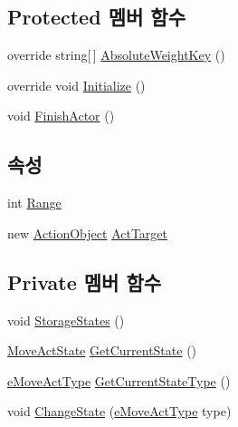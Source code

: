 \subsection*{Protected 멤버 함수}
\begin{DoxyCompactItemize}
\item 
override string\mbox{[}$\,$\mbox{]} \hyperlink{class_move_actor_a1039b1d985874bc3aace417e85bf6676}{Absolute\+Weight\+Key} ()
\item 
override void \hyperlink{class_move_actor_a5dadb0f5c892440b6a884da7ef56b538}{Initialize} ()
\item 
void \hyperlink{class_f_z_1_1_actor_a26e516ab18ada56bb6a9e26c8fd6b709}{Finish\+Actor} ()
\end{DoxyCompactItemize}
\subsection*{속성}
\begin{DoxyCompactItemize}
\item 
int \hyperlink{class_move_actor_a4473f7867a074c8ca605220086c5d8fd}{Range}
\item 
new \hyperlink{class_action_object}{Action\+Object} \hyperlink{class_f_z_1_1_act_obj_actor_abb12c3b4970b1e028a57e16f04065944}{Act\+Target}
\end{DoxyCompactItemize}
\subsection*{Private 멤버 함수}
\begin{DoxyCompactItemize}
\item 
void \hyperlink{class_move_actor_a34b9e1ec5019892f38a8d5087bd5c2fe}{Storage\+States} ()
\item 
\hyperlink{class_move_actor_1_1_move_act_state}{Move\+Act\+State} \hyperlink{class_move_actor_afb5993f5f72725ebd6e1bc58470e5621}{Get\+Current\+State} ()
\item 
\hyperlink{_move_actor_8cs_a1df5a2532cc7e6bde40a57d2dcbe23fe}{e\+Move\+Act\+Type} \hyperlink{class_move_actor_a91d32dcea30abc30c8e04641244e8c09}{Get\+Current\+State\+Type} ()
\item 
void \hyperlink{class_move_actor_a5f441e674d4ce71a460930e395f0966b}{Change\+State} (\hyperlink{_move_actor_8cs_a1df5a2532cc7e6bde40a57d2dcbe23fe}{e\+Move\+Act\+Type} type)
\end{DoxyCompactItemize}
